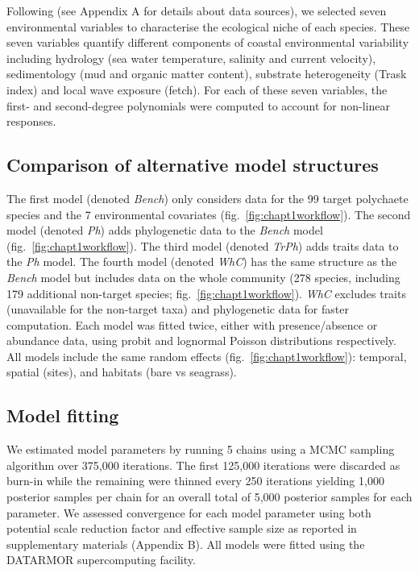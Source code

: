 \documentclass[9pt,biorxiv,doublespacing,lineno]{lapreprint}
\begin{document}
Following \textcite{Boye_2019a} (see Appendix A for details about data
sources), we selected seven environmental variables to characterise the
ecological niche of each species. These seven variables quantify
different components of coastal environmental variability including
hydrology (sea water temperature, salinity and current velocity),
sedimentology (mud and organic matter content), substrate heterogeneity
(Trask index) and local wave exposure (fetch). For each of these seven
variables, the first- and second-degree polynomials were computed to
account for non-linear responses.

\hypertarget{comparison-of-alternative-model-structures}{%
\subsection{Comparison of alternative model
structures}\label{comparison-of-alternative-model-structures}}

The first model (denoted \emph{Bench}) only considers data for the 99
target polychaete species and the 7 environmental covariates
(fig.~\ref{fig:chapt1workflow}). The second model (denoted \emph{Ph})
adds phylogenetic data to the \emph{Bench} model
(fig.~\ref{fig:chapt1workflow}). The third model (denoted \emph{TrPh})
adds traits data to the \emph{Ph} model. The fourth model (denoted
\emph{WhC}) has the same structure as the \emph{Bench} model but
includes data on the whole community (278 species, including 179
additional non-target species; fig.~\ref{fig:chapt1workflow}).
\emph{WhC} excludes traits (unavailable for the non-target taxa) and
phylogenetic data for faster computation. Each model was fitted twice,
either with presence/absence or abundance data, using probit and
lognormal Poisson distributions respectively. All models include the
same random effects (fig.~\ref{fig:chapt1workflow}): temporal, spatial
(sites), and habitats (bare vs seagrass).

\hypertarget{model-fitting}{%
\subsection{Model fitting}\label{model-fitting}}

We estimated model parameters by running 5 chains using a MCMC sampling
algorithm over 375,000 iterations. The first 125,000 iterations were
discarded as burn-in while the remaining were thinned every 250
iterations yielding 1,000 posterior samples per chain for an overall
total of 5,000 posterior samples for each parameter. We assessed
convergence for each model parameter using both potential scale
reduction factor \autocite{Gelman_1992} and effective sample size as
reported in supplementary materials (Appendix B). All models were fitted
using the DATARMOR supercomputing facility.
\end{document}
